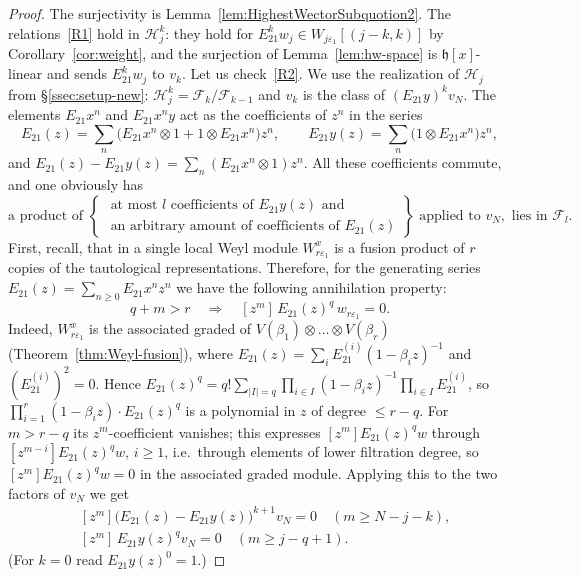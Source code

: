 \documentclass[11pt]{amsart}
\numberwithin{equation}{section}
\theoremstyle{definition}
\newcommand{\fh}{\mathfrak{h}}
\newcommand{\eps}{\varepsilon}
\begin{document}
	\begin{proof}
		The surjectivity is Lemma~\ref{lem:HighestWectorSubquotion2}. The relations~\ref{R1} hold in $\mathcal H_j^k$: they hold for $E_{21}^kw_j\in W_{j\eps_1}[(j-k,k)]$ by Corollary~\ref{cor:weight}, and the surjection of Lemma~\ref{lem:hw-space} is $\fh[x]$-linear and sends $E_{21}^kw_j$ to $v_k$. Let us check~\ref{R2}.
		We use the realization of $\mathcal H_j$ from \S\ref{ssec:setup-new}: $\mathcal H_j^k=\mathcal F_k/\mathcal F_{k-1}$ and $v_k$ is the class of $(E_{21}y)^kv_N$. The elements
		$E_{21}x^n$ and $E_{21}x^ny$ act as the coefficients of $z^n$ in the series
		\[
		E_{21}(z)=\sum_n\big(E_{21}x^n\otimes1+1\otimes E_{21}x^n\big)z^n,\qquad
		E_{21}y(z)=\sum_n\big(1\otimes E_{21}x^n\big)z^n ,
		\]
		and $E_{21}(z)-E_{21}y(z)=\sum_n(E_{21}x^n\otimes1)z^n$. All these coefficients commute, and one obviously has
		\begin{equation}\label{eq:filt}
			\text{a product of }
			\left\{\begin{array}{c}
				\text{ at most }l\text{ coefficients of }E_{21}y(z) \text{ and }
				\\
				\text{ an arbitrary amount of coefficients of }E_{21}(z)
			\end{array}
			\right\}
			\text{ applied to }v_N,\text{ lies in }\mathcal F_l .
		\end{equation}
		First, recall, that in a single local Weyl module $W^x_{r\eps_1}$ is a fusion product of $r$ copies of the tautological representations.
		Therefore, for the generating series
		$E_{21}(z)=\sum_{n\geq 0}E_{21}x^nz^n$ we have the following annihilation property:
		\[
		q+m > r \quad \Rightarrow \quad 
		[z^m]\,E_{21}(z)^q\,w_{r\eps_1}=0.
		\]
		Indeed, $W^x_{r\eps_1}$ is the associated graded of $V(\beta_1)\otimes\dots\otimes V(\beta_r)$ (Theorem~\ref{thm:Weyl-fusion}), where $E_{21}(z)=\sum_iE_{21}^{(i)}(1-\beta_iz)^{-1}$ and $(E_{21}^{(i)})^2=0$. Hence $E_{21}(z)^q=q!\sum_{|I|=q}\prod_{i\in I}(1-\beta_iz)^{-1}\prod_{i\in I}E_{21}^{(i)}$, so $\prod_{i=1}^r(1-\beta_iz)\cdot E_{21}(z)^q$ is a polynomial in $z$ of degree $\le r-q$. For $m>r-q$ its $z^m$-coefficient vanishes; this expresses $[z^m]E_{21}(z)^qw$ through $[z^{m-i}]E_{21}(z)^qw$, $i\ge1$, i.e.\ through elements of lower filtration degree, so $[z^m]E_{21}(z)^qw=0$ in the associated graded module.
		Applying this to the two factors of $v_N$ we get
		\begin{align}
			&[z^m]\big(E_{21}(z)-E_{21}y(z)\big)^{k+1}v_N=0\quad (m\ge N-j-k),\tag{a}\\
			&[z^m]\,E_{21}y(z)^qv_N=0\quad (m\ge j-q+1).\tag{b}
		\end{align}
		(For $k=0$ read $E_{21}y(z)^0=1$.)
		

\end{proof}
\end{document}
